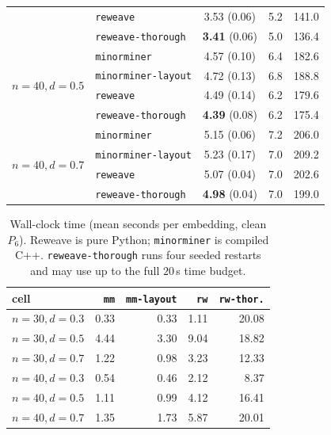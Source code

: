 \documentclass[acmsmall,anonymous,nonacm]{acmart}
\begin{document}
\begin{table}[t]
\begin{tabular}{llccc}
 & \texttt{reweave}          & 3.53 (0.06) & 5.2 & 141.0 \\
 & \texttt{reweave-thorough} & \textbf{3.41} (0.06) & 5.0 & 136.4 \\
\midrule
\multirow{4}{*}{$n{=}40,d{=}0.5$}
 & \texttt{minorminer}          & 4.57 (0.10) & 6.4 & 182.6 \\
 & \texttt{minorminer-layout}   & 4.72 (0.13) & 6.8 & 188.8 \\
 & \texttt{reweave}          & 4.49 (0.14) & 6.2 & 179.6 \\
 & \texttt{reweave-thorough} & \textbf{4.39} (0.08) & 6.2 & 175.4 \\
\midrule
\multirow{4}{*}{$n{=}40,d{=}0.7$}
 & \texttt{minorminer}          & 5.15 (0.06) & 7.2 & 206.0 \\
 & \texttt{minorminer-layout}   & 5.23 (0.17) & 7.0 & 209.2 \\
 & \texttt{reweave}          & 5.07 (0.04) & 7.0 & 202.6 \\
 & \texttt{reweave-thorough} & \textbf{4.98} (0.04) & 7.0 & 199.0 \\
\bottomrule
\end{tabular}
\end{table}

\begin{table}[t]
\caption{Wall-clock time (mean seconds per embedding, clean $P_6$). Reweave
is pure Python; \texttt{minorminer} is compiled C++. \texttt{reweave-thorough}
runs four seeded restarts and may use up to the full $20$\,s time budget.}
\label{tab:timing}
\small
\begin{tabular}{lrrrr}
\toprule
cell & \texttt{mm} & \texttt{mm-layout} & \texttt{rw} & \texttt{rw-thor.} \\
\midrule
$n{=}30,d{=}0.3$ & 0.33 & 0.33 & 1.11 & 20.08 \\
$n{=}30,d{=}0.5$ & 4.44 & 3.30 & 9.04 & 18.82 \\
$n{=}30,d{=}0.7$ & 1.22 & 0.98 & 3.23 & 12.33 \\
$n{=}40,d{=}0.3$ & 0.54 & 0.46 & 2.12 & 8.37 \\
$n{=}40,d{=}0.5$ & 1.11 & 0.99 & 4.12 & 16.41 \\
$n{=}40,d{=}0.7$ & 1.35 & 1.73 & 5.87 & 20.01 \\
\bottomrule
\end{tabular}
\end{table}
\end{document}

